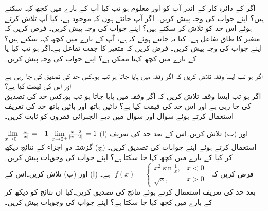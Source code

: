 اگر  کے دائرہ کار کے اندر آپ کو  اور  معلوم ہو تب کیا آپ   کے بارے میں کچھ کہہ سکتے ہیں؟ اپنے جواب کی وجہ پیش کریں۔
اگر آپ جانتے ہوں کہ  موجود ہے، کیا آپ   تلاش کرتے ہوئے اس حد کو تلاش کر سکتے ہیں؟ اپنے جواب کی وجہ پیش کریں۔
فرض کریں کہ  متغیر  کا طاق تفاعل ہے۔ کیا یہ جانتے ہوئے کہ  ہے، آپ   کے بارے میں کچھ کہہ سکتے ہیں؟ اپنے جواب کی وجہ پیش کریں۔
فرض کریں کہ  متغیر  کا جفت تفاعل ہے۔اگر  ہو تب کیا  یا    کے بارے میں کچھ کہنا ممکن ہے؟ اپنے جواب کی وجہ پیش کریں۔

اگر  ہو تب ایسا وقفہ  تلاش کریں کہ اگر  وقفہ  میں پایا جاتا ہو تب  ہو۔کس حد کی تصدیق کی جا رہی ہے اور اس کی قیمت کیا ہے؟ \\
اگر  ہو تب ایسا وقفہ  تلاش کریں کہ اگر  وقفہ  میں پایا جاتا ہو تب  ہو۔کس حد کی تصدیق کی جا رہی ہے اور اس حد کی قیمت کیا ہے؟
دائیں ہاتھ اور بائیں ہاتھ حد کی تعریف استعمال کرتے ہوئے سوال  اور سوال  میں دیے الجبرائی فقروں کو ثابت کریں۔

$\lim\limits_{x\to 0^-}\tfrac{x}{\abs{x}}=-1$
$\lim\limits_{x\to 2^+}\tfrac{x-2}{\abs{x-2}}=1$
(ا)  اور (ب)  تلاش کریں۔اس کے بعد حد کی تعریف استعمال کرتے ہوئے اپنے جوابات کی تصدیق کریں۔ (ج) گزشتہ دو اجزاء کے نتائج  دیکھ کر کیا  کے بارے میں کچھ کہا جا سکتا ہے؟ اپنے جواب کی وجوہات پیش کریں۔\\
فرض کریں کہ 
$\,\,f(x)=\begin{cases}x^2\sin\tfrac{1}{x},&x<0\\ \sqrt{x},&x>0  \,\, \end{cases}$
ہے۔ (ا)  اور (ب)  تلاش کریں۔اس کے بعد حد کی تعریف استعمال کرتے ہوئے نتائج کی تصدیق کریں۔کیا ان نتائج کو دیکھ کر  کے بارے میں کچھ کہا جا سکتا ہے؟ اپنے جواب کی وجوہات  پیش کریں۔

